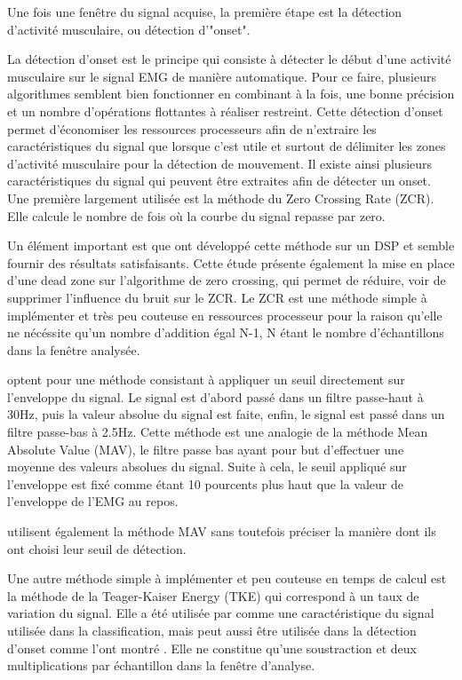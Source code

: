 \documentclass[letterpaper, twoside, 12pt, memoire, creativecommons, hyperref]{thETS}
\begin{document}
Une fois une fenêtre du signal acquise, la première étape est la détection d'activité musculaire, ou détection d'"onset". 

La détection d’onset est le principe qui consiste à détecter le début d’une activité musculaire sur le signal EMG de manière automatique.  Pour ce faire, plusieurs algorithmes semblent bien fonctionner en combinant à la fois, une bonne précision et un nombre d’opérations flottantes à réaliser restreint. Cette détection d’onset permet d’économiser les ressources processeurs afin  de n’extraire les caractéristiques du signal que lorsque c’est utile et surtout de délimiter les zones d’activité musculaire pour la détection de mouvement. 
Il existe ainsi plusieurs caractéristiques du signal qui peuvent être extraites afin de détecter un onset. Une première largement utilisée \citep{Chang1996, Englehart2003, Tenore2007}est la méthode du Zero Crossing Rate (ZCR). Elle calcule le nombre de fois où la courbe du signal repasse par zero. 

Un élément important est que \cite{Chang1996} ont développé cette méthode sur un DSP et semble fournir des résultats satisfaisants. Cette étude présente également la mise en place d’une dead zone sur l’algorithme de zero crossing, qui permet de réduire, voir de supprimer l’influence du bruit sur le ZCR.
Le ZCR est une méthode simple à implémenter et très peu couteuse en ressources processeur pour la raison qu’elle ne nécéssite qu’un nombre d’addition égal N-1, N étant le nombre d’échantillons dans la fenêtre analysée. 

\cite{Peleg2002} optent pour une méthode consistant à appliquer un seuil directement sur l’enveloppe du signal. Le signal est d’abord passé dans un filtre passe-haut à 30Hz, puis la valeur absolue du signal est faite, enfin, le signal est passé dans un filtre passe-bas à 2.5Hz. Cette méthode est une analogie de la méthode Mean Absolute Value (MAV), le filtre passe bas ayant pour but d’effectuer une moyenne des valeurs absolues du signal. Suite à cela, le seuil appliqué sur l’enveloppe est fixé comme étant 10 pourcents plus haut que la valeur de l’enveloppe de l’EMG au repos. 

\cite{Tenore2007} utilisent également la méthode MAV sans toutefois préciser la manière dont ils ont choisi leur seuil de détection. 

Une autre méthode simple à implémenter et peu couteuse en temps de calcul est la méthode de la Teager-Kaiser Energy (TKE) qui correspond à un taux de variation du signal. Elle a été utilisée par \cite{Maheu2011} comme une caractéristique du signal utilisée dans la classification, mais peut aussi être utilisée dans la détection d’onset comme l'ont montré \cite{li2007}. Elle ne constitue qu’une soustraction et deux multiplications par échantillon dans la fenêtre d’analyse. 
\end{document}
